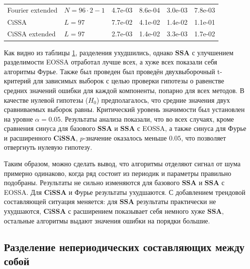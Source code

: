 \documentclass[a4paper, 11pt]{article}
\newcommand{\SSA}{\textbf{SSA}}
\newcommand{\CISSA}{\textbf{CiSSA}}
\begin{document}
\begin{table}[H]
\begin{tabular}{l|l|cccc}
		Fourier extended   & $N = 96 \cdot 2-1$ &
		4.7e-03            & 8.6e-04            & 3.0e-03                               & 7.8e-03                                                                                         \\
		CiSSA              & $L = 97$           &
		7.7e-02            & 4.1e-02            & 1.4e-02                               & 1.1e-01                                                                                         \\
		CiSSA extended     & $L = 97$           &
		2.7e-03            & 1.4e-02            & 3.3e-03                               & 1.7e-02                                                                                         \\
		\hline
	\end{tabular}
	\label{tab:errs_fourier_cissa_trend_noised}
\end{table}


Как видно из таблицы \ref{tab:errs_fourier_cissa_trend_noised}, разделения ухудшились, однако $\SSA$ с улучшением разделимости EOSSA отработал лучше всех, а хуже всех показали себя алгоритмы Фурье. Также был проведен был проведён двухвыборочный t-критерий для зависимых выборок с целью проверки гипотезы о равенстве средних значений ошибки для каждой компоненты, попарно для всех методов. В качестве нулевой гипотезы ($H_0$) предполагалось, что средние значения двух сравниваемых выборок равны. Критический уровень значимости был установлен на уровне $\alpha = 0.05$.
Результаты анализа показали, что во всех случаях, кроме сравнения синуса для базового $\SSA$ и $\SSA$ с EOSSA, а также синуса для Фурье и расширенного $\CISSA$, $p$-значение оказалось меньше $0.05$, что позволяет отвергнуть нулевую гипотезу.

Таким образом, можно сделать вывод, что алгоритмы отделяют сигнал от шума примерно одинаково, когда ряд состоит из периодик и параметры правильно подобраны. Результаты не сильно изменяются для базового $\SSA$ и $\SSA$ с EOSSA. Для $\CISSA$ и Фурье результаты ухудшаются. С добавлением трендовой составляющей ситуация меняется: для $\SSA$ результаты практически не ухудшаются, $\CISSA$ с расширением показывает себя немного хуже $\SSA$, остальные алгоритмы выдают значения ошибки на порядки большие.

\subsection{Разделение непериодических составляющих между собой}
\label{subsubsec:nonperiodic}
\end{document}
